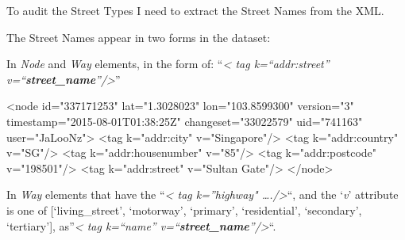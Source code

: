 \documentclass[11pt]{article}
\newenvironment{Shaded}{}{}
\newcommand{\StringTok}[1]{\textcolor[rgb]{0.25,0.44,0.63}{{#1}}}
\newcommand{\NormalTok}[1]{{#1}}
\newcommand{\OperatorTok}[1]{\textcolor[rgb]{0.40,0.40,0.40}{{#1}}}
\newcommand{\BuiltInTok}[1]{{#1}}
\begin{document}
    To audit the Street Types I need to extract the Street Names from the
XML.

The Street Names appear in two forms in the dataset:

In \emph{Node} and \emph{Way} elements, in the form of: ``\emph{\textless{} tag k=``addr:street''
v=``\textbf{street\_name}''/\textgreater{}}''

    \begin{Shaded}
\begin{Highlighting}[]
\OperatorTok{<}\NormalTok{node }\BuiltInTok{id}\OperatorTok{=}\StringTok{"337171253"} \NormalTok{lat}\OperatorTok{=}\StringTok{"1.3028023"} \NormalTok{lon}\OperatorTok{=}\StringTok{"103.8599300"} \NormalTok{version}\OperatorTok{=}\StringTok{"3"} 
\NormalTok{timestamp}\OperatorTok{=}\StringTok{"2015-08-01T01:38:25Z"} \NormalTok{changeset}\OperatorTok{=}\StringTok{"33022579"} \NormalTok{uid}\OperatorTok{=}\StringTok{"741163"}
\NormalTok{user}\OperatorTok{=}\StringTok{"JaLooNz"}\OperatorTok{>}
    \OperatorTok{<}\NormalTok{tag k}\OperatorTok{=}\StringTok{"addr:city"} \NormalTok{v}\OperatorTok{=}\StringTok{"Singapore"}\OperatorTok{/>}
    \OperatorTok{<}\NormalTok{tag k}\OperatorTok{=}\StringTok{"addr:country"} \NormalTok{v}\OperatorTok{=}\StringTok{"SG"}\OperatorTok{/>}
    \OperatorTok{<}\NormalTok{tag k}\OperatorTok{=}\StringTok{"addr:housenumber"} \NormalTok{v}\OperatorTok{=}\StringTok{"85"}\OperatorTok{/>}
    \OperatorTok{<}\NormalTok{tag k}\OperatorTok{=}\StringTok{"addr:postcode"} \NormalTok{v}\OperatorTok{=}\StringTok{"198501"}\OperatorTok{/>}
    \OperatorTok{<}\NormalTok{tag k}\OperatorTok{=}\StringTok{"addr:street"} \NormalTok{v}\OperatorTok{=}\StringTok{"Sultan Gate"}\OperatorTok{/>}
  \OperatorTok{</}\NormalTok{node}\OperatorTok{>}
\end{Highlighting}
\end{Shaded}

    In \emph{Way} elements that have the ``\emph{\textless{} tag k=''highway"
\ldots{}./\textgreater{}}``, and the `\emph{v}' attribute is one of
{[}`living\_street', `motorway', `primary', `residential', `secondary',
`tertiary'{]}, as''\emph{\textless{} tag k=``name''
v=``\textbf{street\_name}''/\textgreater{}}``.
\end{document}
